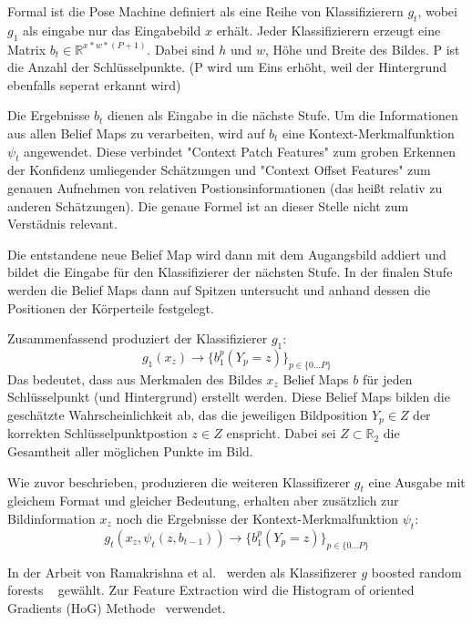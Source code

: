 \documentclass[journal, a4paper]{IEEEtran}
\begin{document}
        Formal ist die Pose Machine definiert als eine Reihe von Klassifizierern $g_t$, wobei $g_1$ als eingabe nur das Eingabebild $x$ erhält. Jeder Klassifizierern erzeugt eine Matrix $b_{t}\in\mathbb{R}^{x*w*(P+1)}$. Dabei sind $h$ und $w$, Höhe und Breite des Bildes. P ist die Anzahl der Schlüsselpunkte. (P wird um Eins erhöht, weil der Hintergrund ebenfalls seperat erkannt wird)

        Die Ergebnisse $b_t$ dienen als Eingabe in die nächste Stufe. 
        Um die Informationen aus allen Belief Maps zu verarbeiten, wird auf $b_t$ eine Kontext-Merkmalfunktion $\psi_t$ angewendet. Diese verbindet "Context Patch Features" zum groben Erkennen der Konfidenz umliegender Schätzungen und "Context Offset Features" zum genauen Aufnehmen von relativen Postionsinformationen (das heißt relativ zu anderen Schätzungen). Die genaue Formel ist an dieser Stelle nicht zum Verstädnis relevant. %

        Die entstandene neue Belief Map wird dann mit dem Augangsbild addiert und bildet die Eingabe für den Klassifizierer der nächsten Stufe. In der finalen Stufe werden die Belief Maps dann auf Spitzen untersucht und anhand dessen die Positionen der Körperteile festgelegt.

        Zusammenfassend produziert der Klassifizierer $g_1$:
        \[ g_1(x_z) \rightarrow \{b_{1}^{p}(Y_p = z) \}_{p \in \{0 \ldots P\}} \] 
        Das bedeutet, dass aus Merkmalen des Bildes $x_z$ Belief Maps $b$ für jeden Schlüsselpunkt (und Hintergrund) erstellt werden. Diese Belief Maps bilden die geschätzte Wahrscheinlichkeit ab, das die jeweiligen Bildposition $Y_p \in Z$ der korrekten Schlüsselpunktpostion $z \in Z$ enspricht. Dabei sei $Z \subset \mathbb{R}_2$ die Gesamtheit aller möglichen Punkte im Bild.

        Wie zuvor beschrieben, produzieren die weiteren Klassifizerer $g_t$ eine Ausgabe mit gleichem Format und gleicher Bedeutung, erhalten aber zusätzlich zur Bildinformation $x_z$ noch die Ergebnisse der Kontext-Merkmalfunktion $\psi_t$:
        \[ g_t(x_z,\psi_t(z,b_{t-1})) \rightarrow \{b_{1}^{p}(Y_p = z) \}_{p \in \{0 \ldots P\}} \] 

        In der Arbeit von Ramakrishna et al.~\cite{ramakrishna2014pose} werden als Klassifizerer $g$ boosted random forests ~\cite{Breiman2001, Friedman2001, Caruana et al. 2009} gewählt. Zur Feature Extraction wird die Histogram of oriented Gradients (HoG) Methode~\cite{HoG} verwendet.
\end{document}
